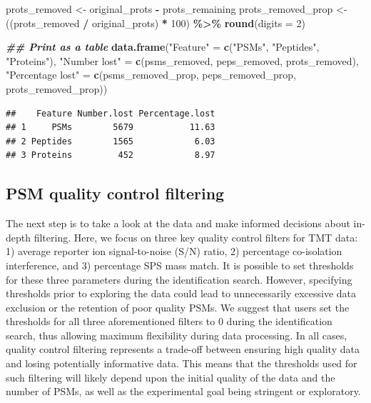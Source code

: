 \documentclass[9pt,a4paper,]{extarticle}
\newenvironment{Shaded}{\begin{snugshade}}{\end{snugshade}}
\newcommand{\AttributeTok}[1]{\textcolor[rgb]{0.13,0.29,0.53}{#1}}
\newcommand{\DecValTok}[1]{\textcolor[rgb]{0.00,0.00,0.81}{#1}}
\newcommand{\DocumentationTok}[1]{\textcolor[rgb]{0.56,0.35,0.01}{\textbf{\textit{#1}}}}
\newcommand{\FunctionTok}[1]{\textcolor[rgb]{0.13,0.29,0.53}{\textbf{#1}}}
\newcommand{\NormalTok}[1]{#1}
\newcommand{\OtherTok}[1]{\textcolor[rgb]{0.56,0.35,0.01}{#1}}
\newcommand{\SpecialCharTok}[1]{\textcolor[rgb]{0.81,0.36,0.00}{\textbf{#1}}}
\newcommand{\StringTok}[1]{\textcolor[rgb]{0.31,0.60,0.02}{#1}}
\begin{document}
\begin{Shaded}
\begin{Highlighting}[]
\NormalTok{prots\_removed }\OtherTok{\textless{}{-}}\NormalTok{ original\_prots }\SpecialCharTok{{-}}\NormalTok{ prots\_remaining}
\NormalTok{prots\_removed\_prop }\OtherTok{\textless{}{-}}\NormalTok{ ((prots\_removed }\SpecialCharTok{/}\NormalTok{ original\_prots) }\SpecialCharTok{*} \DecValTok{100}\NormalTok{) }\SpecialCharTok{\%\textgreater{}\%}
  \FunctionTok{round}\NormalTok{(}\AttributeTok{digits =} \DecValTok{2}\NormalTok{)}
\end{Highlighting}
\end{Shaded}

\begin{Shaded}
\begin{Highlighting}[]
\DocumentationTok{\#\# Print as a table}
\FunctionTok{data.frame}\NormalTok{(}\StringTok{"Feature"} \OtherTok{=} \FunctionTok{c}\NormalTok{(}\StringTok{"PSMs"}\NormalTok{,}
                         \StringTok{"Peptides"}\NormalTok{,}
                         \StringTok{"Proteins"}\NormalTok{),}
           \StringTok{"Number lost"} \OtherTok{=} \FunctionTok{c}\NormalTok{(psms\_removed,}
\NormalTok{                             peps\_removed,}
\NormalTok{                             prots\_removed),}
           \StringTok{"Percentage lost"} \OtherTok{=} \FunctionTok{c}\NormalTok{(psms\_removed\_prop,}
\NormalTok{                                 peps\_removed\_prop,}
\NormalTok{                                 prots\_removed\_prop))}
\end{Highlighting}
\end{Shaded}

\begin{verbatim}
##    Feature Number.lost Percentage.lost
## 1     PSMs        5679           11.63
## 2 Peptides        1565            6.03
## 3 Proteins         452            8.97
\end{verbatim}

\hypertarget{psm-quality-control-filtering}{%
\subsection{PSM quality control filtering}\label{psm-quality-control-filtering}}

The next step is to take a look at the data and make informed decisions about
in-depth filtering. Here, we focus on three key quality control filters for TMT
data: 1) average reporter ion signal-to-noise (S/N) ratio, 2) percentage
co-isolation interference, and 3) percentage SPS mass match. It is possible to
set thresholds for these three parameters during the identification search.
However, specifying thresholds prior to exploring the data could lead to
unnecessarily excessive data exclusion or the retention of poor quality PSMs. We
suggest that users set the thresholds for all three aforementioned filters to 0
during the identification search, thus allowing maximum flexibility during data
processing. In all cases, quality control filtering represents a trade-off
between ensuring high quality data and losing potentially informative data. This
means that the thresholds used for such filtering will likely depend upon the
initial quality of the data and the number of PSMs, as well as the experimental
goal being stringent or exploratory.
\end{document}
